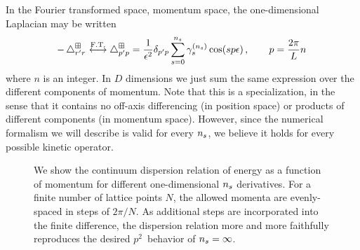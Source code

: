 In the Fourier transformed space, momentum space, the one-dimensional Laplacian may be written
\begin{equation}
    \label{eq:laplacian}
    -\mathop{}\!\mathbin\bigtriangleup_{r'r^{}}^\boxplus
    \overset{\text{F.T.}}{\longleftrightarrow}
    \mathop{}\!\mathbin\bigtriangleup^\boxplus_{p'p}
    =
    \frac{1}{\epsilon^2}
    \delta_{p'p}
    \sum_{s=0}^{{n_s}} \gamma_s^{({n_s})} \cos(s p \epsilon)
    \, , \qquad p = \frac{2 \pi}{L} n \,
\end{equation}
where $n$ is an integer.
In $D$ dimensions we just sum the same expression over the different components of momentum.
Note that this is a specialization, in the sense that it contains no off-axis differencing (in position space) or products of different components (in momentum space).
However, since the numerical formalism we will describe is valid for every ${n_s}$, we believe it holds for every possible kinetic operator.

\begin{figure}
    
    \caption{We show the continuum dispersion relation of energy as a function of momentum for different one-dimensional ${n_s}$ derivatives.  For a finite number of lattice points $N$, the allowed momenta are evenly-spaced in steps of $2\pi/N$.
    As additional steps are incorporated into the finite difference, the dispersion relation more and more faithfully reproduces the desired $p^2$~behavior of ${n_s}=\infty$.
    }
    \label{fig:dispersion relation}
\end{figure}

